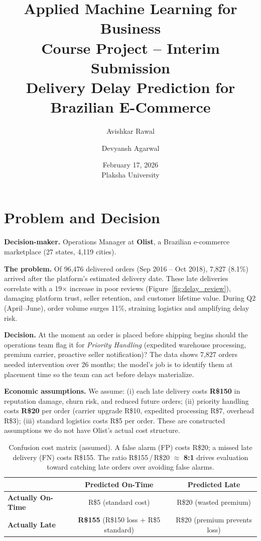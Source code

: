 \documentclass[11pt,a4paper]{article}
\title{\textbf{Applied Machine Learning for Business} \\ 
\large Course Project -- Interim Submission \\ 
Delivery Delay Prediction for Brazilian E-Commerce}
\author{Avishkar Rawal \and Devyansh Agarwal}
\date{February 17, 2026 \\ Plaksha University}
\begin{document}
\maketitle
\vspace{-1em}

\section{Problem and Decision}

\textbf{Decision-maker.} Operations Manager at \textbf{Olist}, a Brazilian e-commerce marketplace (27 states, 4,119 cities).

\textbf{The problem.} Of 96,476 delivered orders (Sep 2016 -- Oct 2018), 7,827 (8.1\%) arrived after the platform's estimated delivery date. These late deliveries correlate with a 19$\times$ increase in poor reviews (Figure~\ref{fig:delay_review}), damaging platform trust, seller retention, and customer lifetime value. During Q2 (April--June), order volume surges 11\%, straining logistics and amplifying delay risk.

\textbf{Decision.} At the moment an order is placed before shipping begins should the operations team flag it for \emph{Priority Handling} (expedited warehouse processing, premium carrier, proactive seller notification)? The data shows 7,827 orders needed intervention over 26 months; the model's job is to identify them at placement time so the team can act before delays materialize.

\textbf{Economic assumptions.} We assume: (i) each late delivery costs \textbf{R\$150} in reputation damage, churn risk, and reduced future orders; (ii) priority handling costs \textbf{R\$20} per order (carrier upgrade R\$10, expedited processing R\$7, overhead R\$3); (iii) standard logistics costs R\$5 per order. These are constructed assumptions we do not have Olist's actual cost structure.

\begin{table}[H]
\centering\small
\begin{tabular}{@{}lcc@{}}
\toprule
& \textbf{Predicted On-Time} & \textbf{Predicted Late} \\ \midrule
\textbf{Actually On-Time} & R\$5 \; (standard cost) & R\$20 \; (wasted premium) \\
\textbf{Actually Late} & \textbf{R\$155} \; (R\$150 loss + R\$5 standard) & R\$20 \; (premium prevents loss) \\ \bottomrule
\end{tabular}
\caption{Confusion cost matrix (assumed). A false alarm (FP) costs R\$20; a missed late delivery (FN) costs R\$155. The ratio R\$155\,/\,R\$20 $\approx$ \textbf{8:1} drives evaluation toward catching late orders over avoiding false alarms.}
\label{tab:cost}
\end{table}
\end{document}
